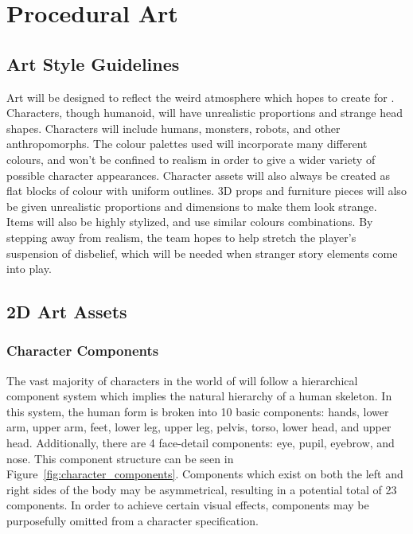 \section{Procedural Art}

\subsection{Art Style Guidelines}
Art will be designed to reflect the weird atmosphere which \ourteam{} hopes to create for \ourgame{}. Characters, though humanoid, will have unrealistic proportions and strange head shapes. Characters will include humans, monsters, robots, and other anthropomorphs. The colour palettes used will incorporate many different colours, and won't be confined to realism in order to give a wider variety of possible character appearances. Character assets will also always be created as flat blocks of colour with uniform outlines. 3D props and furniture pieces will also be given unrealistic proportions and dimensions to make them look strange. Items will also be highly stylized, and use similar colours combinations. By stepping away from realism, the team hopes to help stretch the player's suspension of disbelief, which will be needed when stranger story elements come into play.

\subsection{2D Art Assets}       

\subsubsection{Character Components}
The vast majority of characters in the world of \ourgame{} will follow a hierarchical component system which implies the natural hierarchy of a human skeleton. In this system, the human form is broken into 10 basic components: hands, lower arm, upper arm, feet, lower leg, upper leg, pelvis, torso, lower head, and upper head. Additionally, there are 4 face-detail components: eye, pupil, eyebrow, and nose. This component structure can be seen in Figure~\ref{fig:character_components}. Components which exist on both the left and right sides of the body may be asymmetrical, resulting in a potential total of 23 components. In order to achieve certain visual effects, components may be purposefully omitted from a character specification.

